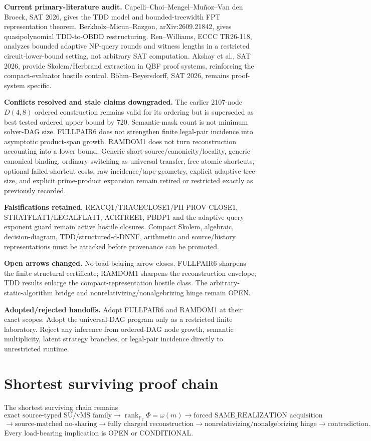 \documentclass[11pt]{article}
\begin{document}
\textbf{Current primary-literature audit.} Capelli--Choi--Mengel--Muñoz--Van den Broeck, SAT 2026, gives the TDD model and bounded-treewidth FPT representation theorem. Berkholz--Micun--Razgon, arXiv:2609.21842, gives quasipolynomial TDD-to-OBDD restructuring. Ren--Williams, ECCC TR26-118, analyzes bounded adaptive NP-query rounds and witness lengths in a restricted circuit-lower-bound setting, not arbitrary SAT computation. Akshay et al., SAT 2026, provide Skolem/Herbrand extraction in QBF proof systems, reinforcing the compact-evaluator hostile control. Böhm--Beyersdorff, SAT 2026, remains proof-system specific.

\textbf{Conflicts resolved and stale claims downgraded.} The earlier 2107-node \(D(4,8)\) ordered construction remains valid for its ordering but is superseded as best tested ordered upper bound by 720. Semantic-mask count is not minimum solver-DAG size. FULLPAIR6 does not strengthen finite legal-pair incidence into asymptotic product-span growth. RAMDOM1 does not turn reconstruction accounting into a lower bound. Generic short-source/canonicity/locality, generic canonical binding, ordinary switching as universal transfer, free atomic shortcuts, optional failed-shortcut costs, raw incidence/tape geometry, explicit adaptive-tree size, and explicit prime-product expansion remain retired or restricted exactly as previously recorded.

\textbf{Falsifications retained.} REACQ1/TRACECLOSE1/PH-PROV-CLOSE1, STRATFLAT1/LEGALFLAT1, ACRTREE1, PBDP1 and the adaptive-query exponent guard remain active hostile closures. Compact Skolem, algebraic, decision-diagram, TDD/structured-d-DNNF, arithmetic and source/history representations must be attacked before provenance can be promoted.

\textbf{Open arrows changed.} No load-bearing arrow closes. FULLPAIR6 sharpens the finite structural certificate; RAMDOM1 sharpens the reconstruction envelope; TDD results enlarge the compact-representation hostile class. The arbitrary-static-algorithm bridge and nonrelativizing/nonalgebrizing hinge remain OPEN.

\textbf{Adopted/rejected handoffs.} Adopt FULLPAIR6 and RAMDOM1 at their exact scopes. Adopt the universal-DAG program only as a restricted finite laboratory. Reject any inference from ordered-DAG node growth, semantic multiplicity, latent strategy branches, or legal-pair incidence directly to unrestricted runtime.

\section*{Shortest surviving proof chain}
The shortest surviving chain remains
\[
\text{exact source-typed SU/vMS family}
\to \operatorname{rank}_{\mathbb F_2}\Phi=\omega(m)
\to \text{forced SAME\_REALIZATION acquisition}
\]
\[
\to \text{source-matched no-sharing}
\to \text{fully charged reconstruction}
\to \text{nonrelativizing/nonalgebrizing hinge}
\to \text{contradiction}.
\]
Every load-bearing implication is OPEN or CONDITIONAL.
\end{document}
